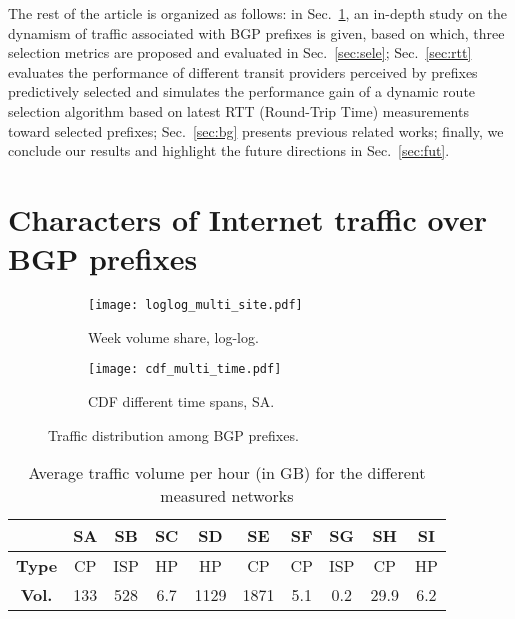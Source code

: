 \documentclass[10pt, conference,letterpaper]{IEEEtran}
\begin{document}
The rest of the article is organized as follows: in Sec.~\ref{sec:chara}, an in-depth study on the dynamism of traffic associated with BGP prefixes is given, based on which, three selection metrics are proposed and evaluated in Sec.~\ref{sec:sele}; Sec.~\ref{sec:rtt} evaluates the performance of different transit providers perceived by prefixes predictively selected and simulates the performance gain of a dynamic route selection algorithm based on latest RTT (Round-Trip Time) measurements toward selected prefixes; Sec.~\ref{sec:bg} presents previous related works; finally, we conclude our results and highlight the future directions in Sec.~\ref{sec:fut}.



\section{Characters of Internet traffic over BGP prefixes}
\label{sec:chara}


\begin{figure*}[!th]
\centering
\begin{subfigure}[b]{0.49\textwidth}
				\centering
                \texttt{[image: loglog\_multi\_site.pdf]}
                \caption{Week volume share, log-log.}
                \label{fig:week_zipf}
        \end{subfigure}  
        \hfill
        \begin{subfigure}[b]{0.49\textwidth}
        		\centering
                \texttt{[image: cdf\_multi\_time.pdf]}
                \caption{CDF different time spans, SA.}
                \label{fig:sa_cdf_multi_time}
        \end{subfigure}    
\caption{Traffic distribution among BGP prefixes.}\label{fig:traffic_dis_site}
\end{figure*}

\begin{table}[!tb]
\centering
\setlength{\tabcolsep}{0.5em}
\begin{tabular}{cccccccccc}
\toprule
& \textbf{SA} & \textbf{SB} & \textbf{SC} & \textbf{SD} & \textbf{SE} & \textbf{SF} & \textbf{SG} & \textbf{SH} & \textbf{SI} \\
\midrule
\textbf{Type} & CP & ISP & HP & HP & CP & CP & ISP & CP & HP \\
\textbf{Vol.} & 133 & 528 & 6.7 & 1129 & 1871 & 5.1 & 0.2 & 29.9 & 6.2 \\
\bottomrule
\end{tabular}
\caption{Average traffic volume per hour (in GB) for the different measured networks}
\label{tab:network_type}
\end{table}
\end{document}
